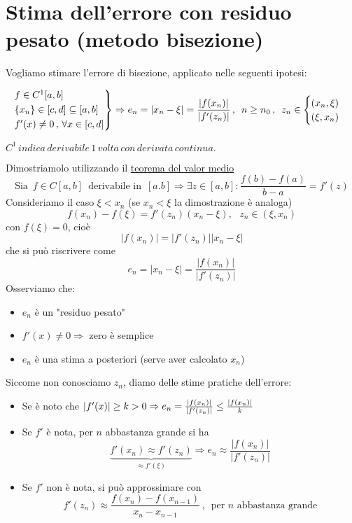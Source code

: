 \section{Stima dell'errore con residuo pesato (metodo bisezione)}
Vogliamo stimare l'errore di bisezione, applicato nelle seguenti ipotesi:

\begin{equation*}
\begin{rcases}
f  \in C^1[a,b]\\
\{x_n\}  \in [c,d] \subseteq [a,b]\\
f'(x)\ne 0 \,,\, \forall x \in [c,d]
\end{rcases}
\Rightarrow e_n = |x_n-\xi| = \frac{|f(x_n)|}{|f'(z_n)|} \,,\,\text{   } n\ge n_0 \,,\,\text{   } z_n \in
\begin{cases}
(x_n, \xi) \\
(\xi, x_n)
\end{cases}
\end{equation*}
\begin{center}
	$C^1 \,indica \,derivabile \,1 \,volta\, con \,derivata\, continua.$
\end{center}
Dimostriamolo utilizzando il \underline{teorema del valor medio}
\[
\text{Sia } \,f\in C[a,b]\,\,\, \text{derivabile in }\, [a.b] \Rightarrow \exists z\in [a,b] : \frac{f(b)-f(a)}{b-a}=f'(z)
\]
Consideriamo il caso $\xi<x_n$ (se $x_n<\xi$ la dimostrazione è analoga)
\begin{equation*}
f(x_n)-f(\xi) = f'(z_n)(x_n-\xi), \text{ } z_n \in (\xi,x_n)
\end{equation*}
con $f(\xi)=0$, cioè
\begin{equation*}
|f(x_n)| = |f'(z_n)||x_n-\xi|
\end{equation*}
che si può riscrivere come
\begin{equation*}
e_n = |x_n-\xi| = \frac{|f(x_n)|}{|f'(z_n)|}
\end{equation*}
Osserviamo che:
\begin{itemize}
	\item $e_n$ è un "residuo pesato"
	\item $f'(x)\ne 0 \Rightarrow$ zero è semplice
	\item $e_n$ è una stima a posteriori (serve aver calcolato $x_n$)
\end{itemize}
Siccome non conosciamo $z_n$, diamo delle stime pratiche dell'errore:
\begin{itemize}
	\item Se è noto che $\abs*{f'(x)}\ge k>0 \Rightarrow e_n=\frac{|f(x_n)|}{|f'(z_n)|}\le  \frac{|f(x_n)|}{k}$
	\item Se $f'$ è nota, per $n$ abbastanza grande si ha
	\[
	\underbrace{f'(x_n)\approx f'(z_n)}_{\approx f'(\xi)} \Longrightarrow e_n \approx \frac{|f(x_n)|}{|f'(z_n)|}
	\]
	\item Se $f'$ non è nota, si può approssimare con
	\[
	f'(z_n)\approx \frac{f(x_n)-f(x_{n-1})}{x_n-x_{n-1}}\,,\,\,\, \text{per $n$ abbastanza grande}
	\]
\end{itemize}
